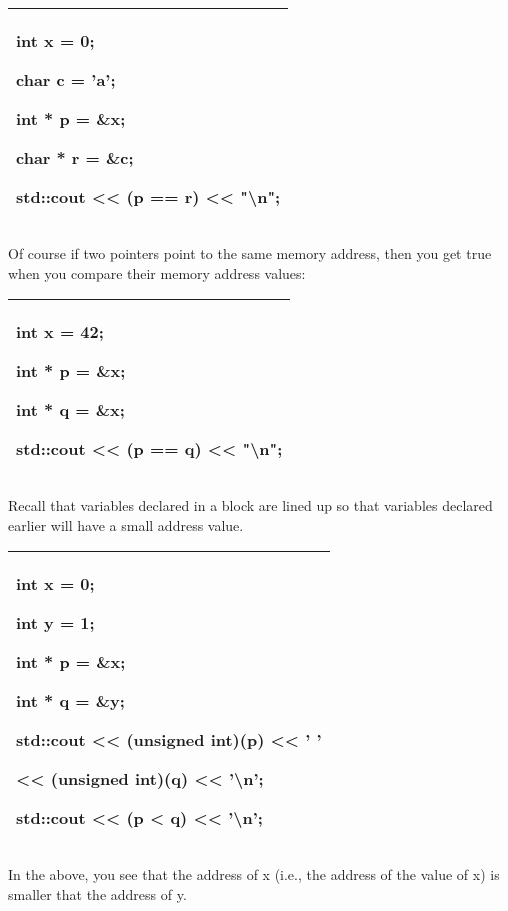 \documentclass[
]{article}
\begin{document}
\begin{longtable}[]{@{}l@{}}
\toprule
\endhead
\begin{minipage}[t]{0.97\columnwidth}\raggedright
int x = 0;

char c = 'a';

int * p = \&x;

char * r = \&c;

std::cout \textless\textless{} (p == r) \textless\textless{}
"\textbackslash n";\strut
\end{minipage}\tabularnewline
\bottomrule
\end{longtable}

Of course if two pointers point to the same memory address, then you get
true when you compare their memory address values:

\begin{longtable}[]{@{}l@{}}
\toprule
\endhead
\begin{minipage}[t]{0.97\columnwidth}\raggedright
int x = 42;

int * p = \&x;

int * q = \&x;

std::cout \textless\textless{} (p == q) \textless\textless{}
"\textbackslash n";\strut
\end{minipage}\tabularnewline
\bottomrule
\end{longtable}

Recall that variables declared in a block are lined up so that variables
declared earlier will have a small address value.

\begin{longtable}[]{@{}l@{}}
\toprule
\endhead
\begin{minipage}[t]{0.97\columnwidth}\raggedright
int x = 0;

int y = 1;

int * p = \&x;

int * q = \&y;

std::cout \textless\textless{} (unsigned int)(p) \textless\textless{} '
'

\textless\textless{} (unsigned int)(q) \textless\textless{}
'\textbackslash n';

std::cout \textless\textless{} (p \textless{} q) \textless\textless{}
'\textbackslash n';\strut
\end{minipage}\tabularnewline
\bottomrule
\end{longtable}

In the above, you see that the address of x (i.e., the address of the
value of x) is smaller that the address of y.
\end{document}
